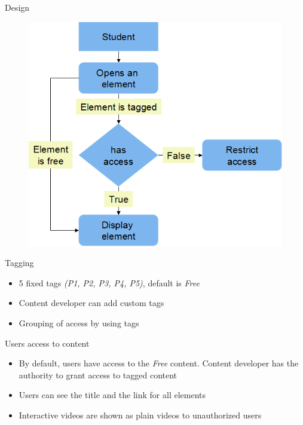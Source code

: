 \documentclass{beamer}
\begin{document}
\begin{frame}{Design}
	\begin{figure}
	\centering
	\includegraphics[width=0.6\linewidth]{media/ACdfd}
	\label{fig:ACdfd}
	\end{figure}
\end{frame}

\begin{frame}{Tagging}
	\begin{itemize}
		\item 5 fixed tags \textit{(P1, P2, P3, P4, P5)}, default is \textit{Free}
		\item Content developer can add custom tags
		\item Grouping of access by using tags
	\end{itemize}
	
\end{frame}

\begin{frame}{Users access to content}
	\begin{itemize}
		\item By default, users have access to the \textit{Free} content. Content developer has the authority to grant access to tagged content
		\item Users can see the title and the link for all elements
		\item Interactive videos are shown as plain videos to unauthorized users
	\end{itemize}
	
\end{frame}
\end{document}
